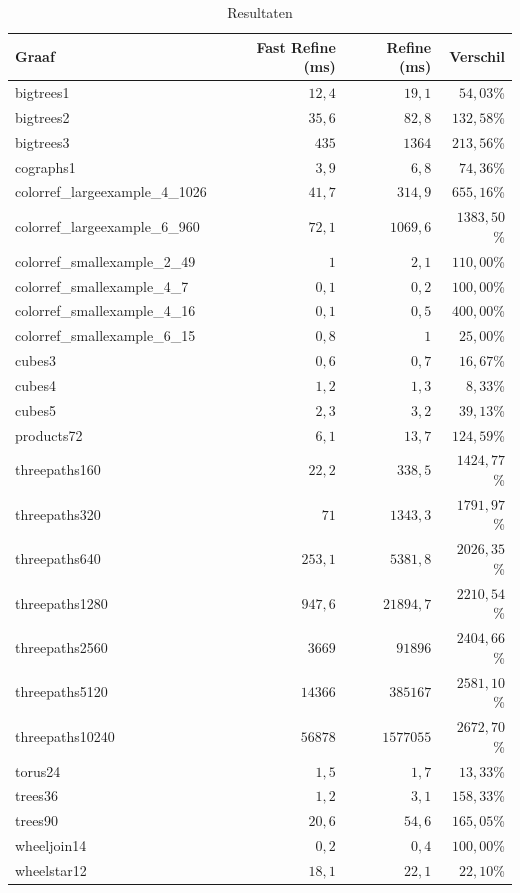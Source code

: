 \documentclass[twoside]{article}
\begin{document}
\begin{table}[H]
\caption{Resultaten}\label{table:resultaten}
\centering
\begin{tabular}{lrrr}
\toprule
Graaf & Fast Refine (ms) & Refine (ms) & Verschil \\
\midrule
\midrule
bigtrees1 & $12,4$ & $19,1$ & $54,03$\% \\
bigtrees2 & $35,6$ & $82,8$ & $132,58$\% \\
bigtrees3 & $435$ & $1364$ & $213,56$\% \\
cographs1 & $3,9$ & $6,8$ & $74,36$\% \\
colorref\_largeexample\_4\_1026 & $41,7$ & $314,9$ & $655,16$\% \\
colorref\_largeexample\_6\_960 & $72,1$ & $1069,6$ & $1383,50$\% \\
colorref\_smallexample\_2\_49 & $1$ & $2,1$ & $110,00$\% \\
colorref\_smallexample\_4\_7 & $0,1$ & $0,2$ & $100,00$\% \\
colorref\_smallexample\_4\_16 & $0,1$ & $0,5$ & $400,00$\% \\
colorref\_smallexample\_6\_15 & $0,8$ & $1$ & $25,00$\% \\
cubes3 & $0,6$ & $0,7$ & $16,67$\% \\
cubes4 & $1,2$ & $1,3$ & $8,33$\% \\
cubes5 & $2,3$ & $3,2$ & $39,13$\% \\
products72 & $6,1$ & $13,7$ & $124,59$\% \\
threepaths160 & $22,2$ & $338,5$ & $1424,77$\% \\
threepaths320 & $71$ & $1343,3$ & $1791,97$\% \\
threepaths640 & $253,1$ & $5381,8$ & $2026,35$\% \\
threepaths1280 & $947,6$ & $21894,7$ & $2210,54$\% \\
threepaths2560 & $3669$ & $91896$ & $2404,66$\% \\
threepaths5120 & $14366$ & $385167$ & $2581,10$\% \\
threepaths10240 & $56878$ & $1577055$ & $2672,70$\% \\
torus24 & $1,5$ & $1,7$ & $13,33$\% \\
trees36 & $1,2$ & $3,1$ & $158,33$\% \\
trees90 & $20,6$ & $54,6$ & $165,05$\% \\
wheeljoin14 & $0,2$ & $0,4$ & $100,00$\% \\
wheelstar12 & $18,1$ & $22,1$ & $22,10$\% \\

\bottomrule
\end{tabular}
\end{table}
\end{document}
